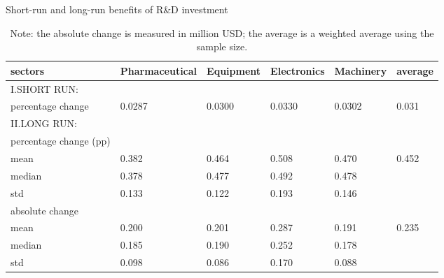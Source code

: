 \documentclass[English]{article}
\begin{document}
\begin{table}[H] %
\centering
\caption{Short-run and long-run benefits of R\&D investment}
\label{T17A}
\begin{tabular}{llllll}
\hline\hline
sectors            & Pharmaceutical & Equipment & Electronics & Machinery&average \\
\hline
I.SHORT RUN: &&&& \\
percentage change & 0.0287 & 0.0300 & 0.0330 & 0.0302 & 0.031 \\
\hline
II.LONG RUN: &&&& \\
percentage change (pp) &&&& \\
mean&0.382  & 0.464  & 0.508  & 0.470  & 0.452 \\
median&0.378  & 0.477  & 0.492  & 0.478  &       \\
std& 0.133  & 0.122  & 0.193  & 0.146  &       \\
absolute change &&&& \\
mean &0.200  & 0.201  & 0.287  & 0.191  & 0.235 \\
median &0.185  & 0.190  & 0.252  & 0.178  &       \\
std& 0.098  & 0.086  & 0.170  & 0.088  & \\     
\hline\hline
\end{tabular}
\caption*{\small{}Note: the absolute change is measured in million USD; the average is a weighted average using the sample size.}{\small \par}
\end{table}
\end{document}
